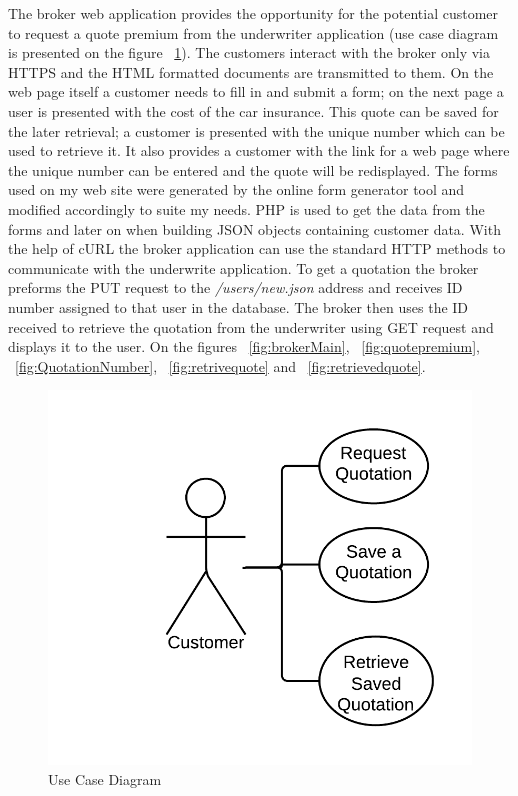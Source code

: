 \documentclass[10pt,a4paper,headinclude=true,twoside]{report}
\begin{document}
The broker web application provides the opportunity for the potential customer to request a quote premium from the underwriter application (use case diagram is presented on the figure ~\ref{fig:usecase}). The customers interact with the broker only via HTTPS and the HTML formatted documents are transmitted to them. On the web page itself a customer needs to fill in and submit a form; on the next page a user is presented with the cost of the car insurance. This quote can be saved for the later retrieval; a customer is presented with the unique number which can be used to retrieve it. It also provides a customer with the link for a web page where the unique number can be entered and the quote will be redisplayed. The forms used on my web site were generated by the online form generator tool and modified accordingly to suite my needs. PHP is used to get the data from the forms and later on when building JSON objects containing customer data. With the help of cURL the broker application can use the standard HTTP methods to communicate with the underwrite application. To get a quotation the broker preforms the PUT request to the \textit{/users/new.json} address and receives ID number assigned to that user in the database. The broker then uses the ID received to retrieve the quotation from the underwriter using GET request and displays it to the user. On the figures ~\ref{fig:brokerMain}, ~\ref{fig:quotepremium}, ~\ref{fig:QuotationNumber}, ~\ref{fig:retrivequote} and ~\ref{fig:retrievedquote}. 


\begin{figure}[H]
\centering
\centerline{\includegraphics[scale=0.25]{./usecase}}
\caption{Use Case Diagram}
\label{fig:usecase}
\end{figure} 
\end{document}
